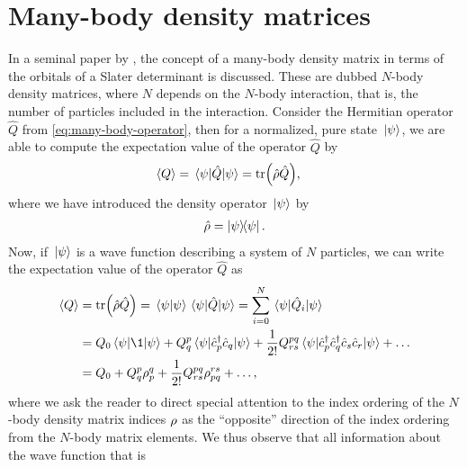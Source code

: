     \section{Many-body density matrices}
        \label{sec:mb-density-matrices}
        In a seminal paper by \citeauthor{lowdin-density-matrices}
        \cite{lowdin-density-matrices}, the concept of a many-body density
        matrix in terms of the orbitals of a Slater determinant is discussed.
        These are dubbed $N$-body density matrices, where $N$ depends on the
        $N$-body interaction, that is, the number of particles included in the
        interaction.
        Consider the Hermitian operator $\hat{Q}$ from
        \autoref{eq:many-body-operator}, then for a normalized, pure state
        $\ket*{\psi}$, we are able to compute the expectation value of the
        operator $\hat{Q}$ by
        \begin{align}
            \expval{Q} &= \mel*{\psi}{\hat{Q}}{\psi}
            = \tr(\hat{\rho} \hat{Q}),
        \end{align}
        where we have introduced the density operator $\ket*{\psi}$ by
        \begin{align}
            \density = \dyad{\psi}{\psi}.
        \end{align}
        Now, if $\ket*{\psi}$ is a wave function describing a system of $N$
        particles, we can write the expectation value of the operator $\hat{Q}$
        as
        \begin{align}
            \expval{Q}
            &= \tr(\density \hat{Q})
            = \braket*{\psi}\mel*{\psi}{\hat{Q}}{\psi}
            = \sum_{i = 0}^{N} \mel*{\psi}{\hat{Q}_i}{\psi}
            \\
            &=
            Q_0 \mel*{\psi}{\1}{\psi}
            + Q^{p}_{q}\mel*{\psi}{\ccr{p}\can{q}}{\psi}
            + \frac{1}{2!}
            Q^{pq}_{rs}
            \mel*{\psi}{\ccr{p}\ccr{q}\can{s}\can{r}}{\psi}
            + \dots
            \\
            &= Q_0 + Q^{p}_{q}\densityten^{q}_{p}
            + \frac{1}{2!} Q^{pq}_{rs} \densityten^{rs}_{pq}
            + \dots,
        \end{align}
        where we ask the reader to direct special attention to the index
        ordering of the $N$-body density matrix indices $\rho$ as the
        ``opposite'' direction of the index ordering from the $N$-body matrix
        elements.
        We thus observe that all information about the wave function that is
